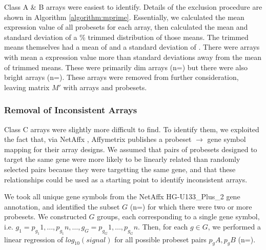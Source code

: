 \documentclass{bioinfo}
\begin{document}
\begin{methods}
Class A \& B arrays were easiest to identify.  Details of the exclusion
procedure are shown in Algorithm \ref{algorithm:mprime}.  Essentially, we
calculated the mean expression value of all probesets for each array, then
calculated the mean and standard deviation of a \% trimmed
distribution of those means.  The trimmed means themselves had a mean of
 and a standard deviation of
.
There were  arrays with mean a expression value more
than  standard deviations away from the mean of trimmed
means.  These were primarily dim arrays (n=) but there were
also bright arrays (n=).  These arrays were removed from
further consideration, leaving matrix $M\prime$ with  arrays and
 probesets.

\subsubsection{Removal of Inconsistent Arrays}\label{inconsistent}

Class C arrays were slightly more difficult to find.  To identify them, we
exploited the fact that, via NetAffx \cite{netaffx}, Affymetrix publishes a
probeset $\rightarrow$ gene symbol mapping for their array designs.  We assumed
that pairs of probesets designed to target the same gene were more likely to be
linearly related than randomly selected pairs because they were targetting the
same gene, and that these relationships could be used as a starting point to
identify inconsistent arrays.

We took all  unique gene symbols from the NetAffx
HG-U133\_Plus\_2 gene annotation, and identified the subset $G$
(n=) for which there were two or more probesets.  We
constructed $G$ groups, each corresponding to a single gene symbol, i.e.
$g_1={p_{g_1}1,\dots,p_{g_1}n},\dots,g_G={p_{g_G}1,\dots,p_{g_G}n}$.  Then, for
each $g{\in}G$, we performed a linear regression of $log_{10}(signal)$ for all
possible probeset pairs $p_gA,p_gB$ (n=).


\end{methods}
\end{document}
